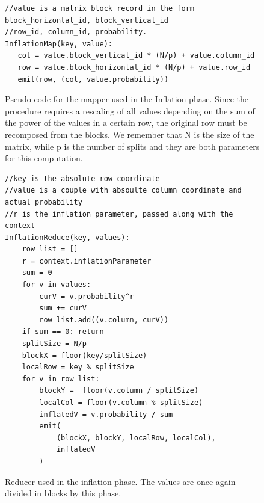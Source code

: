 \begin{figure}[H]
\begin{verbatim}
//value is a matrix block record in the form block_horizontal_id, block_vertical_id
//row_id, column_id, probability.
InflationMap(key, value):
   col = value.block_vertical_id * (N/p) + value.column_id
   row = value.block_horizontal_id * (N/p) + value.row_id
   emit(row, (col, value.probability))
\end{verbatim}
\caption{Pseudo code for the mapper used in the Inflation phase. Since the procedure requires a rescaling of all values depending
on the sum of the power of the values in a certain row, the original row must be recomposed from the blocks. 
We remember that N is the size of the matrix, while p is the number of splits and they are both parameters for this computation.}
\label{fig:inflationMap}
\end{figure}

\begin{figure}[H]
\begin{verbatim}
//key is the absolute row coordinate
//value is a couple with absoulte column coordinate and actual probability
//r is the inflation parameter, passed along with the context
InflationReduce(key, values):
    row_list = []
    r = context.inflationParameter
    sum = 0
    for v in values:
        curV = v.probability^r
        sum += curV
        row_list.add((v.column, curV))
    if sum == 0: return
    splitSize = N/p
    blockX = floor(key/splitSize)
    localRow = key % splitSize
    for v in row_list:
        blockY =  floor(v.column / splitSize)
        localCol = floor(v.column % splitSize)
        inflatedV = v.probability / sum
        emit(
            (blockX, blockY, localRow, localCol),
            inflatedV
        )
\end{verbatim}
\caption{Reducer used in the inflation phase. The values are once again divided in blocks by this phase.}
\label{fig:inflationReduce}
\end{figure}

